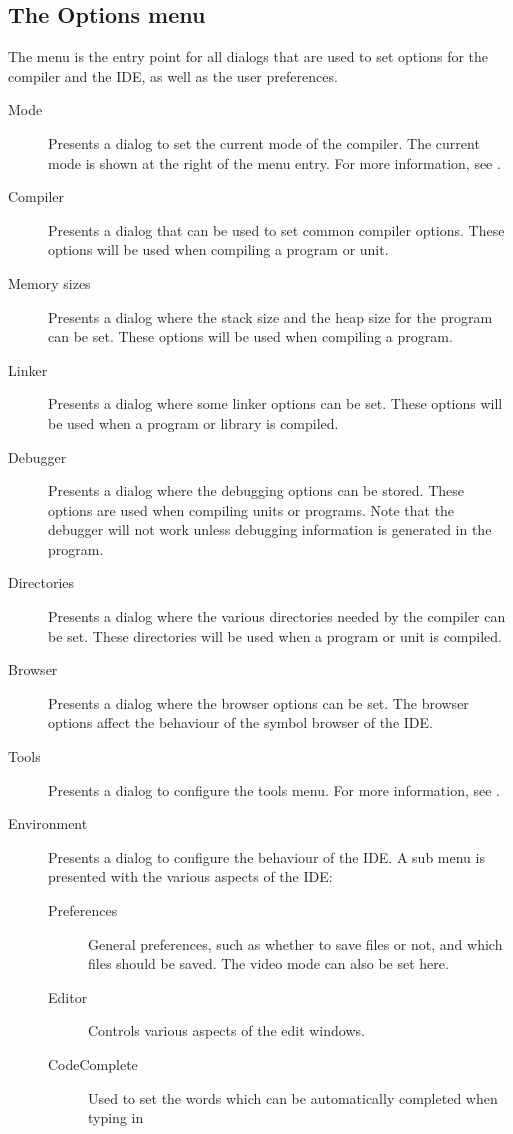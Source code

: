\subsection{The Options menu}
\label{se:menuoptions}
The  menu is the entry point for all dialogs that are used to set
options for the compiler and the IDE, as well as the user preferences.
\begin{description}
\item[Mode] Presents a dialog to set the current mode of the compiler. The
current mode is shown at the right of the menu entry. For more information,
see .
\item[Compiler] Presents a dialog that can be used to set common compiler
options. These options will be used when compiling a program or unit.
\item[Memory sizes]
Presents a dialog where the stack size and the heap size for the program can
be set. These options will be used when compiling a program.
\item[Linker]
Presents a dialog where some linker options can be set. These options will
be used when a program or library is compiled.
\item[Debugger]
Presents a dialog where the debugging options can be stored. These options
are used when compiling units or programs. Note that the debugger will not
work unless debugging information is generated in the program.
\item[Directories]
Presents a dialog where the various directories needed by the compiler can
be set. These directories will be used when a program or unit is compiled.
\item[Browser]
Presents a dialog where the browser options can be set. The browser options
affect the behaviour of the symbol browser of the IDE.
\item[Tools]
Presents a dialog to configure the tools menu. For more information, see
.
\item[Environment]
Presents a dialog to configure the behaviour of the IDE. A sub menu is
presented with the various aspects of the IDE:
\begin{description}
\item[Preferences]
General preferences, such as whether to save files or not, and which files
should be saved. The video mode can also be set here.
\item[Editor]
Controls various aspects of the edit windows.
\item[CodeComplete]
Used to set the words which can be automatically completed when typing in

\end{description}
\end{description}
